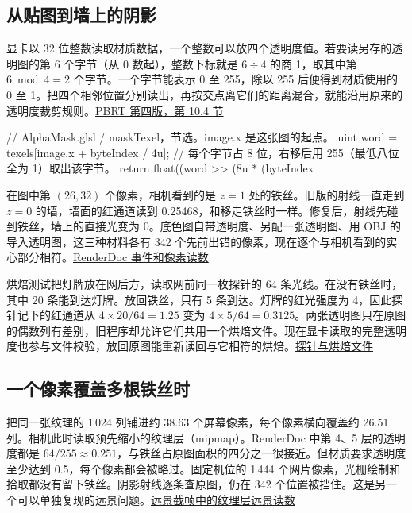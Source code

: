 \clearpage
\subsection{从贴图到墙上的阴影}
显卡以 32 位整数读取材质数据，一个整数可以放四个透明度值。若要读另存的透明图的第 6 个字节（从 0 数起），整数下标就是 $6\div4$ 的商 1，取其中第 $6\bmod4=2$ 个字节。一个字节能表示 0 至 255，除以 255 后便得到材质使用的 0 至 1。把四个相邻位置分别读出，再按交点离它们的距离混合，就能沿用原来的透明度裁剪规则。\href{https://www.pbr-book.org/4ed/Textures_and_Materials/Image_Texture}{PBRT 第四版，第 10.4 节}

\begin{Code}
// AlphaMask.glsl / maskTexel，节选。image.x 是这张图的起点。
uint word = texels[image.x + byteIndex / 4u];
// 每个字节占 8 位，右移后用 255（最低八位全为 1）取出该字节。
return float((word >> (8u * (byteIndex %
\end{Code}

在图中第 $(26,32)$ 个像素，相机看到的是 $z=1$ 处的铁丝。旧版的射线一直走到 $z=0$ 的墙，墙面的红通道读到 0.25468，和移走铁丝时一样。修复后，射线先碰到铁丝，墙上的直接光变为 0。底色图自带透明度、另配一张透明图、用 OBJ 的  导入透明图，这三种材料各有 342 个先前出错的像素，现在逐个与相机看到的实心部分相符。\href{run:../validation/fine-mask/after-replay.json}{RenderDoc 事件和像素读数}

烘焙测试把灯牌放在网后方，读取网前同一枚探针的 64 条光线。在没有铁丝时，其中 20 条能到达灯牌。放回铁丝，只有 5 条到达。灯牌的红光强度为 4，因此探针记下的红通道从 $4\times20/64=1.25$ 变为 $4\times5/64=0.3125$。两张透明图只在原图的偶数列有差别，旧程序却允许它们共用一个烘焙文件。现在显卡读取的完整透明度也参与文件校验，放回原图能重新读回与它相符的烘焙。\href{run:../validation/fine-mask/after.json}{探针与烘焙文件}

\subsection{一个像素覆盖多根铁丝时}
把同一张纹理的 1\,024 列铺进约 38.63 个屏幕像素，每个像素横向覆盖约 26.51 列。相机此时读取预先缩小的纹理层（mipmap）。RenderDoc 中第 4、5 层的透明度都是 $64/255\approx0.251$，与铁丝占原图面积的四分之一很接近。但材质要求透明度至少达到 0.5，每个像素都会被略过。固定机位的 1\,444 个网片像素，光栅绘制和拾取都没有留下铁丝。阴影射线逐条查原图，仍在 342 个位置被挡住。这是另一个可以单独复现的远景问题。\href{run:../validation/fine-mask/far-after-replay.json}{远景截帧中的纹理层}\quad\href{run:../validation/fine-mask/far-after.json}{远景读数}

